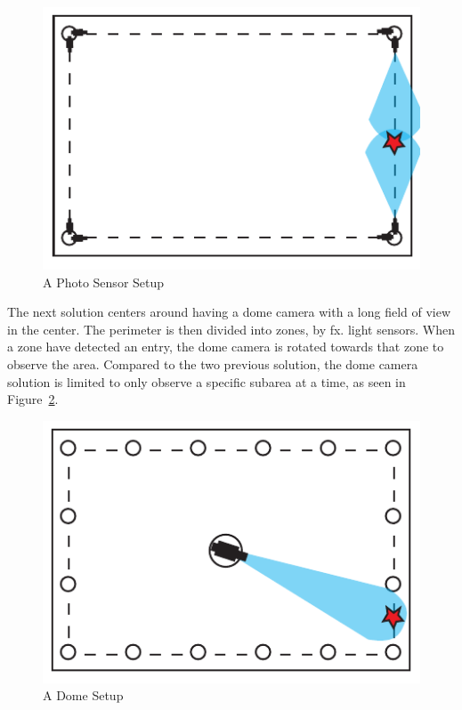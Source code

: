 \begin{figure}[htb]
    \centering
    \includegraphics[width=\textwidth]{gfx/light_sensor.pdf}
    \caption{A Photo Sensor Setup}
    \label{fig:photo_sensor}
\end{figure}

The next solution centers around having a dome camera with a long field of view in the center.
The perimeter is then divided into zones, by fx. light sensors.
When a zone have detected an entry, the dome camera is rotated towards that zone to observe the area.
Compared to the two previous solution, the dome camera solution is limited to only observe a specific subarea at a time, as seen in Figure~\ref{fig:drone_sensor}. \\

\begin{figure}[htb]
    \centering
    \includegraphics[width=\textwidth]{gfx/drome_sensor.pdf}
    \caption{A Dome Setup}
    \label{fig:drone_sensor}
\end{figure}
